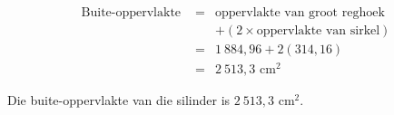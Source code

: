 \begin{wex}
{\begin{equation*}
\begin{array}{rcl}
 \mbox{Buite-oppervlakte }&=& \mbox{oppervlakte van groot reghoek}  \\
&&+ (2\times \mbox{oppervlakte van sirkel})\\
&=& 1~884,96 + 2(314,16) \\
&=&2~513,3\mbox{ cm}^2
\end{array}
\end{equation*}

Die buite-oppervlakte van die silinder is $2~513,3\mbox{ cm}^2$.
}
\end{wex}


\vspace*{-50pt}




